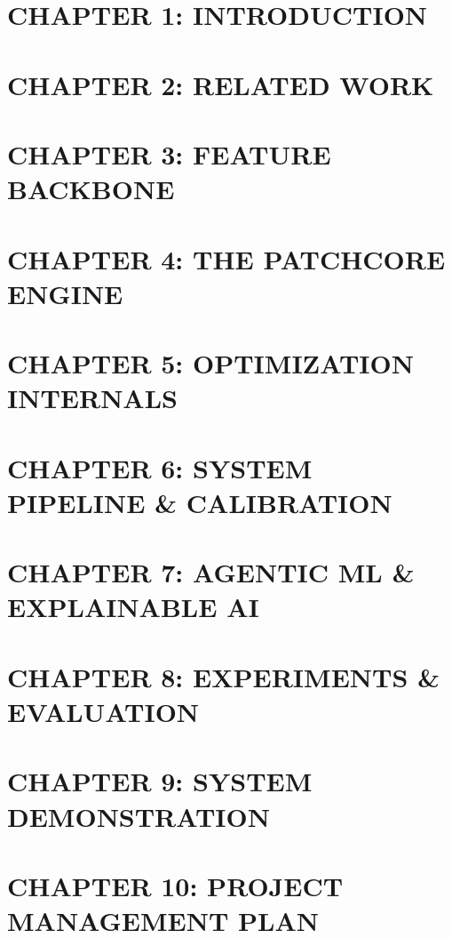 \documentclass[12pt, a4paper, oneside]{report}
\begin{document}
\tableofcontents
\listoffigures
{}
\listoftables
{}



\chapter{CHAPTER 1: INTRODUCTION}
\item
  \chapter{CHAPTER 2: RELATED WORK}
\item
  \chapter{CHAPTER 3: FEATURE BACKBONE}
\item
  \chapter{CHAPTER 4: THE PATCHCORE ENGINE}
\item
  \chapter{CHAPTER 5: OPTIMIZATION INTERNALS}
\item
  \chapter{CHAPTER 6: SYSTEM PIPELINE \& CALIBRATION}
\item
  \chapter{CHAPTER 7: AGENTIC ML \& EXPLAINABLE AI}
\item
  \chapter{CHAPTER 8: EXPERIMENTS \& EVALUATION}
\item
  \chapter{CHAPTER 9: SYSTEM DEMONSTRATION}
\item
  \chapter{CHAPTER 10: PROJECT MANAGEMENT PLAN}
\item
\end{document}
